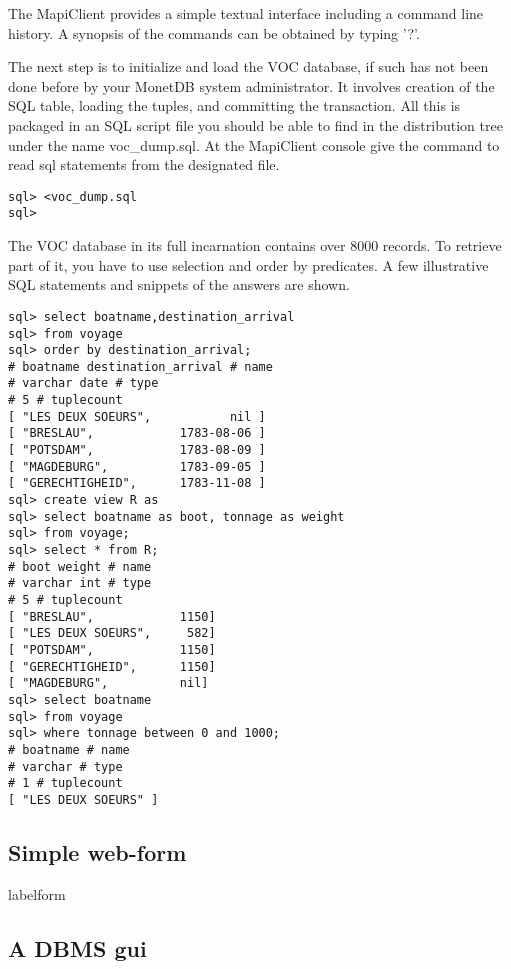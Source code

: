 \documentclass[10pt,twocolumn,fleqn]{article}
\begin{document}
The MapiClient provides a simple textual interface including
a command line history. A synopsis of the commands can be obtained
by typing '?'.

The next step is to initialize and load the VOC database, if such has
not been done before by your MonetDB system administrator. It involves
creation of the SQL table, loading the tuples, and committing the
transaction. All this is packaged in an SQL script file you should
be able to find in the distribution tree under the name voc\_dump.sql.
At the MapiClient console give the command to read sql statements
from the designated file.

\begin{verbatim}
sql> <voc_dump.sql
sql>
\end{verbatim}

The VOC database in its full incarnation contains over 8000
records. To retrieve part of it, you have to use selection and order
by predicates. A few illustrative SQL statements and snippets of
the answers are shown.
{\footnotesize
\begin{verbatim}
sql> select boatname,destination_arrival 
sql> from voyage 
sql> order by destination_arrival;
# boatname destination_arrival # name
# varchar date # type
# 5 # tuplecount
[ "LES DEUX SOEURS",           nil ]
[ "BRESLAU",            1783-08-06 ]
[ "POTSDAM",            1783-08-09 ]
[ "MAGDEBURG",          1783-09-05 ]
[ "GERECHTIGHEID",      1783-11-08 ]
sql> create view R as 
sql> select boatname as boot, tonnage as weight 
sql> from voyage;
sql> select * from R;
# boot weight # name
# varchar int # type
# 5 # tuplecount
[ "BRESLAU",            1150]
[ "LES DEUX SOEURS",     582]
[ "POTSDAM",            1150]
[ "GERECHTIGHEID",      1150]
[ "MAGDEBURG",          nil]
sql> select boatname 
sql> from voyage
sql> where tonnage between 0 and 1000;
# boatname # name
# varchar # type
# 1 # tuplecount
[ "LES DEUX SOEURS" ]
\end{verbatim}
}

\subsection{Simple web-form}
label{form}
\subsection{A DBMS gui}
\label{ide}
\end{document}
